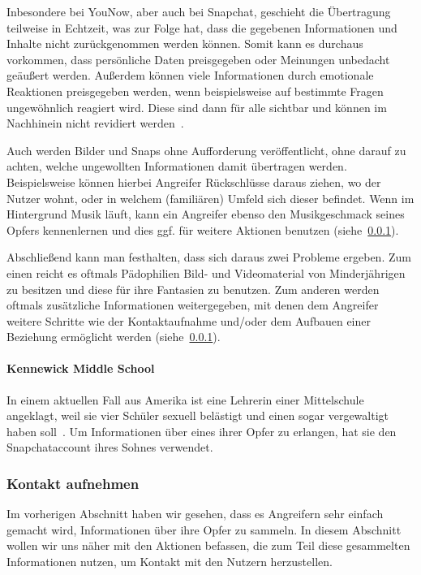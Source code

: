 Inbesondere bei YouNow, aber auch bei Snapchat, geschieht die \"Ubertragung
teilweise in Echtzeit, was zur Folge hat, dass die gegebenen Informationen und
Inhalte nicht zur\"uckgenommen werden k\"onnen. Somit kann es durchaus
vorkommen, dass pers\"onliche Daten preisgegeben oder Meinungen unbedacht
ge\"au{\ss}ert werden. Au{\ss}erdem k\"onnen viele Informationen durch
emotionale Reaktionen preisgegeben werden, wenn beispielsweise auf bestimmte
Fragen ungew\"ohnlich reagiert wird. Diese sind dann f\"ur alle sichtbar und
k\"onnen im Nachhinein nicht revidiert werden~\cite{KS15}.

Auch werden Bilder und Snaps ohne Aufforderung ver\"offentlicht, ohne darauf zu
achten, welche ungewollten Informationen damit \"ubertragen werden.
Beispielsweise k\"onnen hierbei Angreifer R\"uckschl\"usse daraus ziehen, wo
der Nutzer wohnt, oder in welchem (famili\"aren) Umfeld sich dieser befindet.
Wenn im Hintergrund Musik l\"auft, kann ein Angreifer ebenso den Musikgeschmack
seines Opfers kennenlernen und dies ggf. f\"ur weitere Aktionen benutzen
(siehe~\ref{gefahren:kinder:treffen}).

Abschlie{\ss}end kann man festhalten, dass sich daraus zwei Probleme ergeben.
Zum einen reicht es oftmals P\"adophilien Bild- und Videomaterial von
Minderj\"ahrigen zu besitzen und diese f\"ur ihre Fantasien zu benutzen. Zum
anderen werden oftmals zus\"atzliche Informationen weitergegeben, mit denen dem
Angreifer weitere Schritte wie der Kontaktaufnahme und/oder dem Aufbauen einer
Beziehung erm\"oglicht werden (siehe~\ref{gefahren:kinder:treffen}).

\paragraph{Kennewick Middle School} In einem aktuellen Fall aus Amerika ist
eine Lehrerin einer Mittelschule angeklagt, weil sie vier Sch\"uler sexuell
bel\"astigt und einen sogar vergewaltigt haben soll~\cite{tri-middle}. Um
Informationen \"uber eines ihrer Opfer zu erlangen, hat sie den Snapchataccount
ihres Sohnes verwendet.

\subsubsection{Kontakt aufnehmen}
\label{gefahren:kinder:treffen}
Im vorherigen Abschnitt haben wir gesehen, dass es Angreifern sehr einfach
gemacht wird, Informationen \"uber ihre Opfer zu sammeln. In diesem Abschnitt
wollen wir uns n\"aher mit den Aktionen befassen, die zum Teil diese
gesammelten Informationen nutzen, um Kontakt mit den Nutzern herzustellen.
